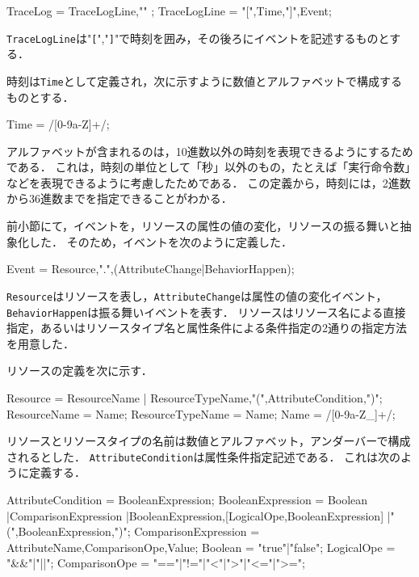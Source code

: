 \begin{EBNF}
TraceLog = { TraceLogLine,"\n" };
TraceLogLine = "[",Time,"]",Event;
\end{EBNF}

\verb|TraceLogLine|は"\verb|[|","\verb|]|"で時刻を囲み，その後ろにイベントを記述するものとする．

時刻は\verb|Time|として定義され，次に示すように数値とアルファベットで構成するものとする．

\begin{EBNF}
Time = /[0-9a-Z]+/;
\end{EBNF}

アルファベットが含まれるのは，10進数以外の時刻を表現できるようにするためである．
これは，時刻の単位として「秒」以外のもの，たとえば「実行命令数」などを表現できるように考慮したためである．
この定義から，時刻には，2進数から36進数までを指定できることがわかる．

前小節にて，イベントを，リソースの属性の値の変化，リソースの振る舞いと抽象化した．
そのため，イベントを次のように定義した．

\begin{EBNF}
Event = Resource,".",(AttributeChange|BehaviorHappen);
\end{EBNF}

{\tt Resource}はリソースを表し，{\tt AttributeChange}は属性の値の変化イベント，{\tt BehaviorHappen}は振る舞いイベントを表す．
リソースはリソース名による直接指定，あるいはリソースタイプ名と属性条件による条件指定の2通りの指定方法を用意した．

リソースの定義を次に示す．

\begin{EBNF}
Resource = ResourceName
         | ResourceTypeName,"(",AttributeCondition,")";
ResourceName = Name;
ResourceTypeName = Name;
Name = /[0-9a-Z_]+/;
\end{EBNF}

リソースとリソースタイプの名前は数値とアルファベット，アンダーバーで構成されるとした．
{\tt AttributeCondition}は属性条件指定記述である．
これは次のように定義する．

\begin{EBNF}
AttributeCondition = BooleanExpression;
BooleanExpression = Boolean
   |ComparisonExpression
   |BooleanExpression,[{LogicalOpe,BooleanExpression}]
   |"(",BooleanExpression,")";
ComparisonExpression = AttributeName,ComparisonOpe,Value;
Boolean = "true"|"false";
LogicalOpe = "&&"|"||";
ComparisonOpe = "=="|"!="|"<"|">"|"<="|">=";
\end{EBNF}

